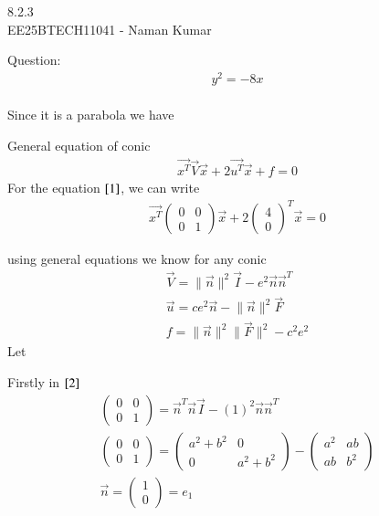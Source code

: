 \documentclass[a5paper,10pt]{article}
\author{EE25BTECH11041-Naman Kumar }
\begin{document}
\begin{center}
    \huge{8.2.3}\\
    \large{EE25BTECH11041 - Naman Kumar}
\end{center}
Question:\\
\begin{align}
y^2 = -8x \label{1} 
\end{align}
\solution \\
Since it is a parabola we have

General equation of conic
\begin{align}
    \vec{x^T}\vec{V}\vec{x}+2\vec{u^T}\vec{x}+f=0
\end{align}
For the equation $\eqref{1}$, we can write
\begin{align}
    \vec{x^T}\begin{pmatrix}0&0\\0&1\end{pmatrix}\vec{x}+2\begin{pmatrix}4\\0\end{pmatrix}^T\vec{x}=0
\end{align}

using general equations we know for any conic
\begin{align}
    \vec{V}=\lVert\vec{n}\rVert^2\vec{I}-e^2\vec{n}\vec{n}^T \label{2} \\
    \vec{u}=ce^2\vec{n}-\lVert\vec{n}\rVert^2\vec{F} \label{3} \\
    f=\lVert\vec{n}\rVert^2\lVert\vec{F}\rVert^2-c^2e^2 \label{4}
\end{align}
Let

Firstly in $\eqref{2}$
\begin{align}
    \begin{pmatrix}0&0\\0&1\end{pmatrix}=\vec{n}^T\vec{n}\vec{I}-(1)^2\vec{n}\vec{n}^T\\
    \begin{pmatrix}0&0\\0&1\end{pmatrix}=\begin{pmatrix}a^2+b^2&0\\0&a^2+b^2\end{pmatrix}-\begin{pmatrix}a^2&ab\\ab&b^2\end{pmatrix}\\
    \vec{n}=\begin{pmatrix}1\\0\end{pmatrix}=e_1
\end{align}
\end{document}
